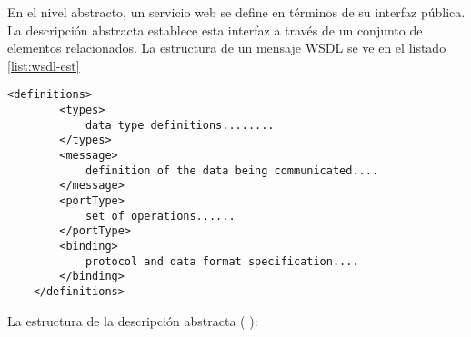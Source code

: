  
 En el nivel abstracto, un servicio web se define en términos de su interfaz pública. La descripci\'on  abstracta establece esta interfaz a través de un conjunto de elementos relacionados.
  La estructura de un mensaje WSDL se ve en el listado \ref{list:wsdl-est} 
 
 \begin{lstlisting}[label=list:wsdl-est, caption=Estructura de mensaje WSDL]
 	<definitions>
 		<types>
 			data type definitions........
 		</types>
 		<message>
 			definition of the data being communicated....
 		</message>
 		<portType>
 			set of operations......
 		</portType>
 		<binding>
 			protocol and data format specification....
 		</binding> 
 	</definitions> 
 \end{lstlisting}
 
 
 La estructura de la descripción abstracta (\cite{W3C2022} \cite{Erl2008}):
